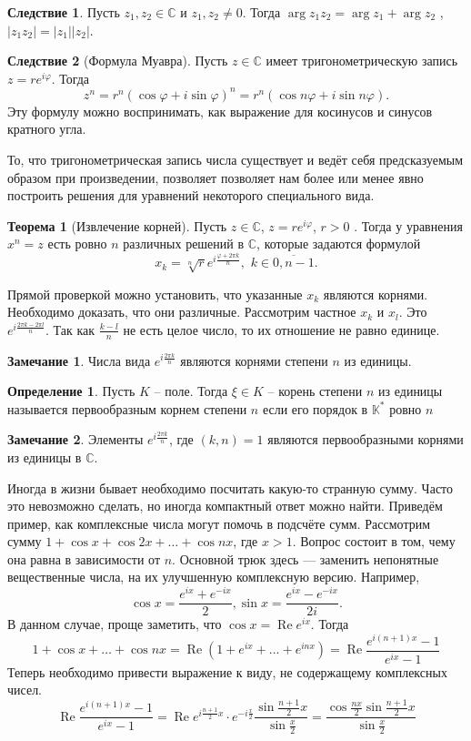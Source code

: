 \documentclass[10pt,a4paper,oneside]{book} %
\theoremstyle{definition}
\newtheorem*{rem}{Замечание}
\newtheorem*{defn}{Определение}
\newtheorem{thm}{Теорема}
\newtheorem{cor}{Следствие}
\newcommand{\mb}[1]{\mathbb{#1}}
\newcommand{\ovl}{\overline}
\newcommand{\re}{\operatorname{Re}}
\def\thrm{\begin{thm}}
\def\ethrm{\end{thm}}
\def\dfn{\begin{defn}}
\def\edfn{\end{defn}}
\def\crl{\begin{cor}}
\def\ecrl{\end{cor}}
\def\rm{\begin{rem}}
\def\erm{\end{rem}}
\begin{document}
\crl Пусть $z_1, z_2\in \mb C$  и $z_1,z_2\neq 0$. Тогда $\arg z_1z_2 = \arg z_1 + \arg z_2$ , $|z_1z_2| = |z_1 ||z_2 |$.
\ecrl

\crl[Формула Муавра] Пусть $z\in \mb C$ имеет тригонометрическую запись $z=re^{i\varphi}$. Тогда
$$z^{n}=r^{n}(\cos \varphi +i\sin \varphi )^{n}=r^{n}(\cos n\varphi +i\sin n\varphi ).$$
Эту формулу можно воспринимать, как выражение для косинусов и синусов кратного угла.
\ecrl

То, что тригонометрическая запись числа существует и ведёт себя предсказуемым образом при произведении, позволяет позволяет нам более или менее явно построить решения для уравнений некоторого специального вида.

\thrm[Извлечение корней] Пусть $z\in \mb C$, $z=re^{i\varphi}$, $r>0$ . Тогда у уравнения $x^n=z$ есть ровно $n$ различных
решений в $\mb C$, которые задаются формулой
$$ x_k =\sqrt[n]{r} e^{i\frac{\varphi + 2\pi k}{n}} ,\,\, k\in \ovl{0,n-1}.$$
\ethrm
\proof
Прямой проверкой можно установить, что указанные $x_k$ являются корнями. Необходимо доказать, что они различные. Рассмотрим частное $x_k$ и $x_l$. Это $e^{i\frac{ 2\pi k- 2\pi l}{n}}$. Так как $\frac{k-l}{n}$ не есть целое число, то их отношение не равно единице.
\endproof

\rm Числа вида $e^{i\frac{2\pi k}{n}}$ являются корнями степени $n$ из единицы. 
\erm

\dfn Пусть $K$ -- поле. Тогда $\xi\in K$ -- корень степени $n$ из единицы  называется первообразным корнем степени $n$ если его порядок в $\mb K^*$ ровно $n$ 
\edfn

\rm Элементы $e^{i\frac{2\pi k}{n}}$, где $(k,n)=1$ являются первообразными корнями из единицы в $\mb C$. 
\erm



Иногда в жизни бывает необходимо посчитать какую-то странную сумму. Часто это невозможно сделать, но иногда компактный ответ можно найти. Приведём пример, как комплексные числа могут помочь в подсчёте сумм.
Рассмотрим сумму $1+ \cos x + \cos 2x + \dots + \cos nx$, где $x > 1$. Вопрос состоит в том, чему она равна в зависимости от $n$. Основной трюк здесь --- заменить непонятные вещественные числа, на их улучшенную комплексную версию. Например, $$\cos x = \frac{e^{ix}+e^{-ix}}{2}, \sin x = \frac{e^{ix}-e^{-ix}}{2i}.$$ 
В данном случае, проще заметить, что $\cos x=\re e^{ix}$. Тогда
$$1 + \cos x+ \dots + \cos nx = \re(1+ e^{ix} + \dots + e^{inx}) = \re \frac{e^{i(n+1)x}-1}{e^{ix}-1}$$
Теперь необходимо привести выражение к виду, не содержащему комплексных чисел.
$$\re \frac{e^{i(n+1)x}-1}{e^{ix}-1} = \re e^{i\tfrac{n+1}{2}x}\cdot e^{-i\tfrac{x}{2}}\frac{\sin \tfrac{n+1}{2}x}{\sin\tfrac{x}{2}}= \frac{\cos \tfrac{nx}{2} \sin \tfrac{n+1}{2}x}{\sin\tfrac{x}{2}}$$
\end{document}
